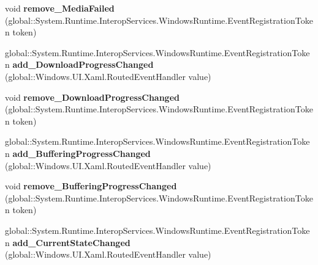 \begin{DoxyCompactItemize}
\item 
\mbox{\label{interface_windows_1_1_u_i_1_1_xaml_1_1_controls_1_1_i_media_element_afb81febce56b850ab6cff6148327aaea}} 
void {\bfseries remove\+\_\+\+Media\+Failed} (global\+::\+System.\+Runtime.\+Interop\+Services.\+Windows\+Runtime.\+Event\+Registration\+Token token)
\item 
\mbox{\label{interface_windows_1_1_u_i_1_1_xaml_1_1_controls_1_1_i_media_element_a57e937eee241a696cb1b801e5d5d4291}} 
global\+::\+System.\+Runtime.\+Interop\+Services.\+Windows\+Runtime.\+Event\+Registration\+Token {\bfseries add\+\_\+\+Download\+Progress\+Changed} (global\+::\+Windows.\+U\+I.\+Xaml.\+Routed\+Event\+Handler value)
\item 
\mbox{\label{interface_windows_1_1_u_i_1_1_xaml_1_1_controls_1_1_i_media_element_a8aaeaafe6a46fee402a829a599d1aae3}} 
void {\bfseries remove\+\_\+\+Download\+Progress\+Changed} (global\+::\+System.\+Runtime.\+Interop\+Services.\+Windows\+Runtime.\+Event\+Registration\+Token token)
\item 
\mbox{\label{interface_windows_1_1_u_i_1_1_xaml_1_1_controls_1_1_i_media_element_a84b55fbe2bab2bbb0288457d0c16c52c}} 
global\+::\+System.\+Runtime.\+Interop\+Services.\+Windows\+Runtime.\+Event\+Registration\+Token {\bfseries add\+\_\+\+Buffering\+Progress\+Changed} (global\+::\+Windows.\+U\+I.\+Xaml.\+Routed\+Event\+Handler value)
\item 
\mbox{\label{interface_windows_1_1_u_i_1_1_xaml_1_1_controls_1_1_i_media_element_a080932b18d45c0da51366f4fe31041cf}} 
void {\bfseries remove\+\_\+\+Buffering\+Progress\+Changed} (global\+::\+System.\+Runtime.\+Interop\+Services.\+Windows\+Runtime.\+Event\+Registration\+Token token)
\item 
\mbox{\label{interface_windows_1_1_u_i_1_1_xaml_1_1_controls_1_1_i_media_element_a357521c35f1e1c53f78bf72c62939f5f}} 
global\+::\+System.\+Runtime.\+Interop\+Services.\+Windows\+Runtime.\+Event\+Registration\+Token {\bfseries add\+\_\+\+Current\+State\+Changed} (global\+::\+Windows.\+U\+I.\+Xaml.\+Routed\+Event\+Handler value)

\end{DoxyCompactItemize}

